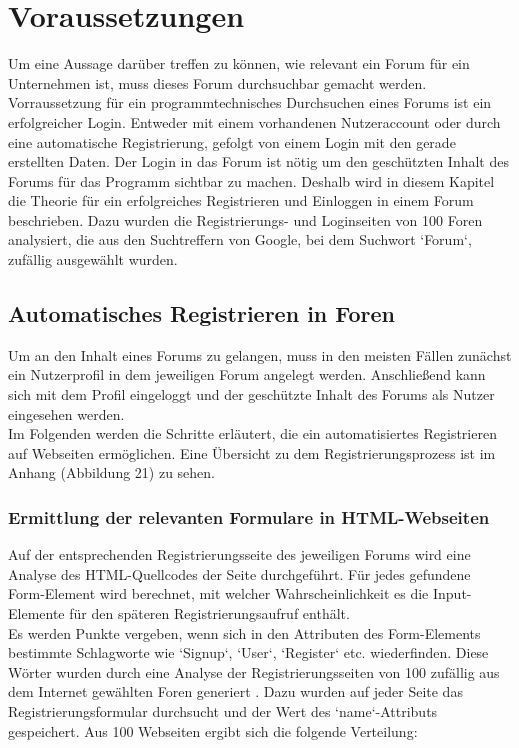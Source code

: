 \section{Voraussetzungen}
Um eine Aussage darüber treffen zu können, wie relevant ein Forum für ein Unternehmen ist, muss dieses Forum durchsuchbar gemacht werden.
Vorraussetzung für ein programmtechnisches Durchsuchen eines Forums ist ein erfolgreicher Login. Entweder mit einem vorhandenen Nutzeraccount oder durch eine automatische Registrierung, gefolgt von einem Login mit den gerade erstellten Daten.
Der Login in das Forum ist nötig um den geschützten Inhalt des Forums für das Programm sichtbar zu machen. Deshalb wird in diesem Kapitel die Theorie für ein erfolgreiches Registrieren und Einloggen in einem Forum beschrieben. Dazu wurden die Registrierungs- und Loginseiten von 100 Foren analysiert, die aus den Suchtreffern von Google, bei dem Suchwort `Forum`, zufällig ausgewählt wurden.

\subsection {Automatisches Registrieren in Foren}
Um an den Inhalt eines Forums zu gelangen, muss in den meisten Fällen zunächst ein Nutzerprofil in dem jeweiligen Forum angelegt werden. Anschließend kann sich mit dem Profil eingeloggt und der geschützte Inhalt des Forums als Nutzer eingesehen werden. \\
Im Folgenden werden die Schritte erläutert, die ein automatisiertes Registrieren auf Webseiten ermöglichen.
Eine Übersicht zu dem Registrierungsprozess ist im Anhang (Abbildung 21) zu sehen.

\subsubsection{Ermittlung der relevanten Formulare in HTML-Webseiten}
Auf der entsprechenden Registrierungsseite des jeweiligen Forums wird eine Analyse des HTML-Quellcodes der Seite durchgeführt.
Für jedes gefundene Form-Element wird berechnet, mit welcher Wahrscheinlichkeit es die Input-Elemente für den späteren Registrierungsaufruf enthält. \\
Es werden Punkte vergeben, wenn sich in den Attributen des Form-Elements bestimmte Schlagworte wie `Signup`, `User`, `Register` etc. wiederfinden.
Diese Wörter wurden durch eine Analyse der Registrierungsseiten von 100 zufällig aus dem Internet gewählten Foren generiert . Dazu wurden auf jeder Seite das Registrierungsformular durchsucht und der Wert des `name`-Attributs gespeichert. Aus 100 Webseiten ergibt sich die folgende Verteilung:

